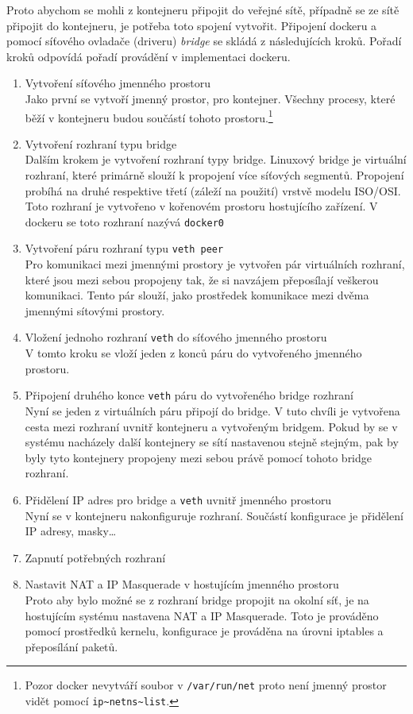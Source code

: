 Proto abychom se mohli z kontejneru připojit do veřejné sítě, případně se ze sítě připojit do kontejneru, je potřeba toto spojení vytvořit. Připojení  dockeru a pomocí síťového ovladače (driveru) \textit{bridge} se skládá z následujících kroků. Pořadí kroků odpovídá pořadí provádění v implementaci dockeru.
\begin{enumerate}
\item Vytvoření síťového jmenného prostoru \\
Jako první se vytvoří jmenný prostor, pro kontejner. Všechny procesy, které běží v kontejneru budou součástí tohoto prostoru.\footnote{Pozor docker nevytváří soubor v \verb-/var/run/net- proto není jmenný prostor vidět pomocí \verb-ip~netns~list-.}
\item Vytvoření rozhraní typu bridge \\
Dalším krokem je vytvoření rozhraní typy bridge. Linuxový bridge je virtuální rozhraní, které primárně slouží k propojení více síťových segmentů. Propojení probíhá na druhé respektive třetí (záleží na použití) vrstvě modelu ISO/OSI. Toto rozhraní je vytvořeno v kořenovém prostoru hostujícího zařízení. V dockeru se toto rozhraní nazývá \verb|docker0|
\item Vytvoření páru rozhraní typu \verb|veth peer|\\
Pro komunikaci mezi jmennými prostory je vytvořen pár virtuálních rozhraní, které jsou mezi sebou propojeny tak, že si navzájem přeposílají veškerou komunikaci. Tento pár slouží, jako prostředek komunikace mezi dvěma jmennými sítovými prostory.
\item Vložení jednoho rozhraní \verb|veth| do síťového jmenného prostoru \\
V tomto kroku se vloží jeden z konců páru do vytvořeného jmenného prostoru. 
\item Připojení druhého konce \verb|veth| páru do vytvořeného bridge rozhraní \\
Nyní se jeden z virtuálních páru připojí do bridge. V tuto chvíli je vytvořena cesta mezi rozhraní uvnitř kontejneru a vytvořeným bridgem. Pokud by se v systému nacházely další kontejnery se sítí nastavenou stejně stejným, pak by byly tyto kontejnery propojeny mezi sebou právě pomocí tohoto bridge rozhraní.
\item Přidělení IP adres pro bridge a \verb|veth| uvnitř jmenného prostoru \\
Nyní se v kontejneru nakonfiguruje rozhraní. Součástí konfigurace je přidělení IP adresy, masky\ldots  
\item Zapnutí potřebných rozhraní \\
\item Nastavit NAT a IP Masquerade v hostujícím jmenného prostoru \\
Proto aby bylo možné se z rozhraní bridge propojit na okolní síť, je na hostujícím systému nastavena NAT a IP Masquerade. Toto je prováděno pomocí prostředků kernelu, konfigurace je prováděna na úrovni iptables a přeposílání paketů.
\end{enumerate}
